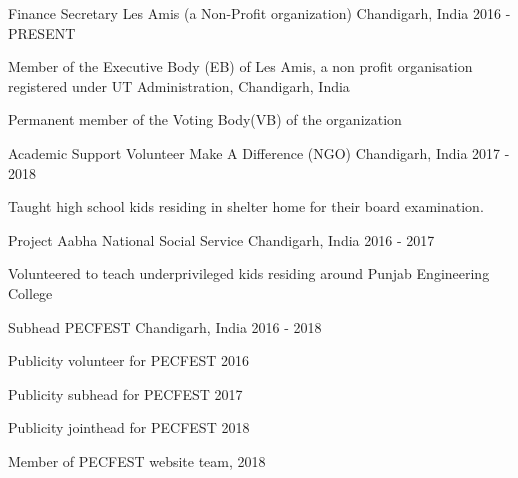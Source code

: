 \begin{cventries}
  \cventry
    {Finance Secretary}
    {Les Amis (a Non-Profit organization)}
    {Chandigarh, India}
    {2016 - PRESENT}
    {
      \begin{cvitems}
        \item {Member of the Executive Body (EB) of Les Amis, a non profit organisation registered under UT Administration, Chandigarh, India}
        \item {Permanent member of the Voting Body(VB) of the organization}
      \end{cvitems}
    }
  \cventry
    {Academic Support Volunteer}
    {Make A Difference (NGO)}
    {Chandigarh, India}
    {2017 - 2018}
    {
      \begin{cvitems}
        \item {Taught high school kids residing in shelter home for their board examination.}
      \end{cvitems}
    }
   \cventry
    {Project Aabha}
    {National Social Service}
    {Chandigarh, India}
    {2016 - 2017}
    {
      \begin{cvitems}
        \item Volunteered to teach underprivileged kids residing around Punjab Engineering College
      \end{cvitems}
    }
    \cventry
    {Subhead}
    {PECFEST}
    {Chandigarh, India}
    {2016 - 2018}
    {
      \begin{cvitems}
        \item Publicity volunteer for PECFEST 2016
        \item Publicity subhead for PECFEST 2017
        \item Publicity jointhead for PECFEST 2018
        \item Member of PECFEST website team, 2018
      \end{cvitems}
    }
   
\end{cventries}
